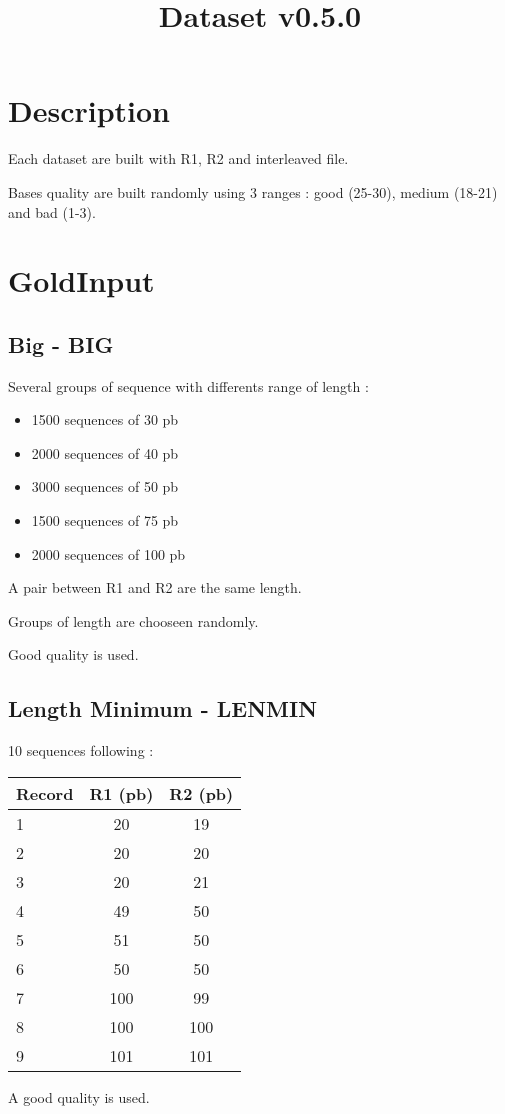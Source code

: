 \documentclass{article}
\title{Dataset v0.5.0}
\begin{document}
\maketitle

\section{Description}
Each dataset are built with R1, R2 and interleaved file.\par
Bases quality are built randomly using 3 ranges : good (25-30), medium (18-21) and bad (1-3).

\section{GoldInput}
\subsection{Big - BIG}
Several groups of sequence with differents range of length :
\begin{itemize}
    \item 1500 sequences of 30 pb 
    \item 2000 sequences of 40 pb
    \item 3000 sequences of 50 pb
    \item 1500 sequences of 75 pb
    \item 2000 sequences of 100 pb
\end{itemize}
A pair between R1 and R2 are the same length.\par
Groups of length are chooseen randomly.\par
Good quality is used.\par

\subsection{Length Minimum - LENMIN}
10 sequences following :
\begin{table}[H]
\begin{tabular}{|l|c|c|}\hline
\textbf{Record} & \textbf{R1} (pb) & \textbf{R2} (pb) \\ \hline
    1 & 20 & 19 \\ \hline
    2 & 20 & 20 \\ \hline
    3 & 20 & 21 \\ \hline
    4 & 49 & 50 \\ \hline
    5 & 51 & 50 \\ \hline
    6 & 50 & 50 \\ \hline
    7 & 100 & 99 \\ \hline
    8 & 100 & 100 \\ \hline
    9 & 101 & 101 \\ \hline
\end{tabular}
\end{table}
A good quality is used.
\end{document}
